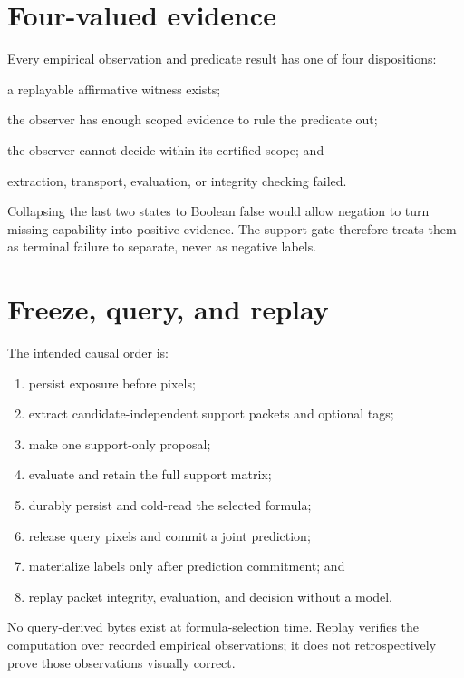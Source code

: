 \documentclass[11pt]{article}
\begin{document}
\section{Four-valued evidence}

Every empirical observation and predicate result has one of four
dispositions:
\begin{description}[leftmargin=3.2cm,style=nextline]
  \item[\texttt{present}] a replayable affirmative witness exists;
  \item[\texttt{certified\_absent}] the observer has enough scoped evidence to
    rule the predicate out;
  \item[\texttt{indeterminate}] the observer cannot decide within its certified
    scope; and
  \item[\texttt{error}] extraction, transport, evaluation, or integrity
    checking failed.
\end{description}

Collapsing the last two states to Boolean false would allow negation to turn
missing capability into positive evidence.  The support gate therefore treats
them as terminal failure to separate, never as negative labels.

\section{Freeze, query, and replay}

The intended causal order is:
\begin{enumerate}[leftmargin=*]
  \item persist exposure before pixels;
  \item extract candidate-independent support packets and optional tags;
  \item make one support-only proposal;
  \item evaluate and retain the full support matrix;
  \item durably persist and cold-read the selected formula;
  \item release query pixels and commit a joint prediction;
  \item materialize labels only after prediction commitment; and
  \item replay packet integrity, evaluation, and decision without a model.
\end{enumerate}
No query-derived bytes exist at formula-selection time.  Replay verifies the
computation over recorded empirical observations; it does not retrospectively
prove those observations visually correct.
\end{document}
